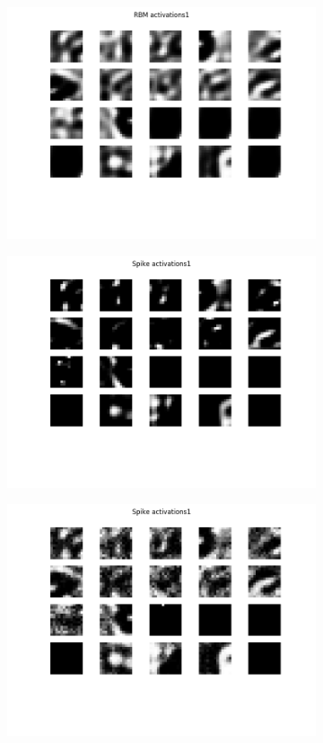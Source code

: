 \begin{figure}
	\begin{subfigure}[t]{.24\textwidth}
  		\centering
  		\includegraphics[width=.9\linewidth]{imgs/convert/rbm00001.png}
  		\label{fig:sub1}
	\end{subfigure}%
	\begin{subfigure}[t]{.24\textwidth}
  		\centering
  		\includegraphics[width=.9\linewidth]{imgs/convert/cnn00001.png}
  		\label{fig:sub2}
	\end{subfigure}
	\begin{subfigure}[t]{.24\textwidth}
  		\centering
  		\includegraphics[width=.9\linewidth]{imgs/convert/coba00001.png}

\end{subfigure}
\end{figure}
